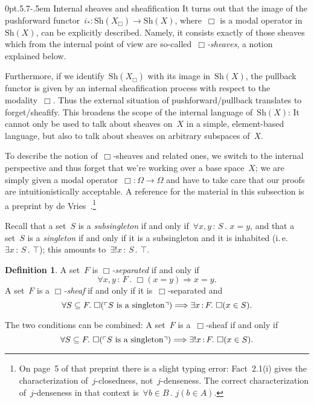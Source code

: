 \documentclass[10pt,reqno,a4paper]{amsbook}
\makeatletter
\theoremstyle{definition}
\newtheorem{defn}{Definition}[section]
\theoremstyle{plain}
\theoremstyle{remark}
\newcommand{\Sh}{\mathrm{Sh}}
\newcommand{\?}{\,{:}\,}
\renewcommand{\_}{\mathpunct{.}\,}
\newcommand{\speak}[1]{\ulcorner\text{\textnormal{#1}}\urcorner}
\newcommand{\ie}{i.\,e.\@\xspace}
\def\subsection{\@startsection{subsection}{2}%
  {0pt}{.5\linespacing\@plus.7\linespacing}{-.5em}%
  {\normalfont\bfseries}}
\makeatother
\begin{document}
\subsection{Internal sheaves and sheafification}\label{sect:internal-sheaves}
It turns out that the image of
the pushforward functor~$i_* : \Sh(X_\Box) \to \Sh(X)$, where~$\Box$ is a modal
operator in~$\Sh(X)$, can be explicitly described. Namely, it consists exactly
of those sheaves which from the internal point of view
are so-called~\emph{$\Box$-sheaves}, a notion explained below.

Furthermore, if we identify~$\Sh(X_\Box)$ with its image in~$\Sh(X)$, the
pullback functor is given by an internal sheafification process with respect to
the modality~$\Box$. Thus the external situation of pushforward/pullback
translates to forget/sheafify. This broadens the scope of the internal
language of~$\Sh(X)$: It cannot only be used to talk about sheaves on~$X$ in a simple,
element-based language, but also to talk about sheaves on arbitrary subspaces
of~$X$.

To describe the notion of~$\Box$-sheaves and related ones, we switch to the internal
perspective and thus forget that we're working over a base space~$X$; we are simply given a modal operator~$\Box :
\Omega \to \Omega$ and have to take care that our proofs are intuitionistically acceptable. A
reference for the material in this subsection is a preprint by de
Vries~\cite{vries:sheafification}.\footnote{On page~5 of that
preprint there is a slight typing error: Fact~2.1(i) gives the
characterization of~$j$-closedness, not~$j$-denseness. The correct
characterization of~$j$-denseness in that context is~$\forall b \in B\_ j(b \in
A)$.}

Recall that a set~$S$ is a \emph{subsingleton} if and only if~$\forall x,y\?S\_
x = y$, and that a set~$S$ is a \emph{singleton} if and only if it is a subsingleton and
it is inhabited (\ie~$\exists x\?S\_ \top$); this amounts to~$\exists!x\?S\_ \top$.

\begin{defn}\label{defn:box-sheaves}
A set~$F$ is \emph{$\Box$-separated} if and only if
\[ \forall x,y\?F\_ \Box(x = y) \Longrightarrow x = y. \]
A set~$F$ is a \emph{$\Box$-sheaf} if and only if it is~$\Box$-separated and
\[ \forall S \subseteq F\_
  \Box(\speak{$S$ is a singleton}) \Longrightarrow
  \exists x\?F\_ \Box(x \in S). \]
\end{defn}

The two conditions can be combined: A set~$F$ is a~$\Box$-sheaf if and only if
\[ \forall S \subseteq F\_
  \Box(\speak{$S$ is a singleton}) \Longrightarrow
  \exists! x\?F\_ \Box(x \in S). \]
\end{document}
